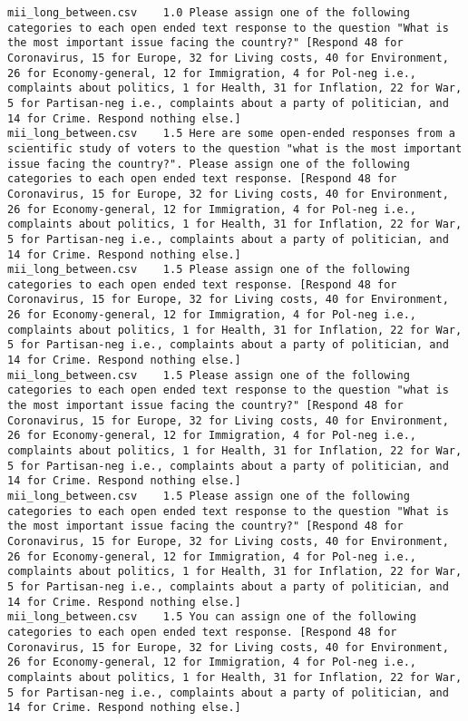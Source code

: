 \begin{lstlisting}[label=lst:promptvariants]
mii_long_between.csv	1.0	Please assign one of the following categories to each open ended text response to the question "What is the most important issue facing the country?" [Respond 48 for Coronavirus, 15 for Europe, 32 for Living costs, 40 for Environment, 26 for Economy-general, 12 for Immigration, 4 for Pol-neg i.e., complaints about politics, 1 for Health, 31 for Inflation, 22 for War, 5 for Partisan-neg i.e., complaints about a party of politician, and 14 for Crime. Respond nothing else.]
mii_long_between.csv	1.5	Here are some open-ended responses from a scientific study of voters to the question "what is the most important issue facing the country?". Please assign one of the following categories to each open ended text response. [Respond 48 for Coronavirus, 15 for Europe, 32 for Living costs, 40 for Environment, 26 for Economy-general, 12 for Immigration, 4 for Pol-neg i.e., complaints about politics, 1 for Health, 31 for Inflation, 22 for War, 5 for Partisan-neg i.e., complaints about a party of politician, and 14 for Crime. Respond nothing else.]
mii_long_between.csv	1.5	Please assign one of the following categories to each open ended text response. [Respond 48 for Coronavirus, 15 for Europe, 32 for Living costs, 40 for Environment, 26 for Economy-general, 12 for Immigration, 4 for Pol-neg i.e., complaints about politics, 1 for Health, 31 for Inflation, 22 for War, 5 for Partisan-neg i.e., complaints about a party of politician, and 14 for Crime. Respond nothing else.]
mii_long_between.csv	1.5	Please assign one of the following categories to each open ended text response to the question "what is the most important issue facing the country?" [Respond 48 for Coronavirus, 15 for Europe, 32 for Living costs, 40 for Environment, 26 for Economy-general, 12 for Immigration, 4 for Pol-neg i.e., complaints about politics, 1 for Health, 31 for Inflation, 22 for War, 5 for Partisan-neg i.e., complaints about a party of politician, and 14 for Crime. Respond nothing else.]
mii_long_between.csv	1.5	Please assign one of the following categories to each open ended text response to the question "What is the most important issue facing the country?" [Respond 48 for Coronavirus, 15 for Europe, 32 for Living costs, 40 for Environment, 26 for Economy-general, 12 for Immigration, 4 for Pol-neg i.e., complaints about politics, 1 for Health, 31 for Inflation, 22 for War, 5 for Partisan-neg i.e., complaints about a party of politician, and 14 for Crime. Respond nothing else.]
mii_long_between.csv	1.5	You can assign one of the following categories to each open ended text response. [Respond 48 for Coronavirus, 15 for Europe, 32 for Living costs, 40 for Environment, 26 for Economy-general, 12 for Immigration, 4 for Pol-neg i.e., complaints about politics, 1 for Health, 31 for Inflation, 22 for War, 5 for Partisan-neg i.e., complaints about a party of politician, and 14 for Crime. Respond nothing else.]

\end{lstlisting}
